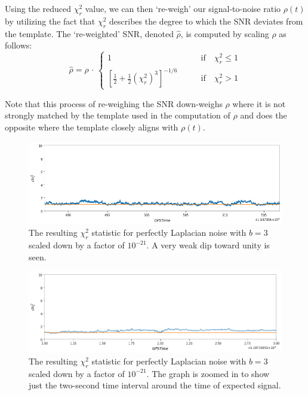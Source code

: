 \documentclass[preprint,
letterpaper,
 amsmath,amssymb,
 aps,
]{revtex4-2}
\begin{document}
Using the reduced $\chi_r^2$ value, we can then `re-weigh' our signal-to-noise ratio $\rho(t)$ by utilizing the fact that $\chi_r^2$ describes the degree to which the SNR deviates from the template. The `re-weighted' SNR, denoted $\hat{\rho}$, is computed by scaling $\rho$ as follows:
\begin{equation}
    \hat{\rho} = \rho \,\cdot \,
    \begin{cases}
    1     & \quad\quad\text{if}\quad \chi^2_r\leq1\\
     \left[\frac{1}{2} + \frac{1}{2}(\chi^2_r)^3\right]^{-1/6}   & \quad\quad\text{if}\quad \chi^2_r>1
    \end{cases}
\end{equation}

Note that this process of re-weighing the SNR down-weighs $\rho$ where it is not strongly matched by the template used in the computation of $\rho$ and does the opposite where the template closely aligns with $\rho(t)$.

\begin{figure}[t]
\includegraphics[width = .9\textwidth]{chi2 laplace b=3 zoomed.png}
\caption{The resulting $\chi^2_r$ statistic for perfectly Laplacian noise with $b=3$ scaled down by a factor of $10^{-21}$. A very weak dip toward unity is seen.}
\centering
\end{figure} 

\begin{figure}[t]
\includegraphics[width = .9\textwidth]{chi2 laplace b=3.png}
\caption{The resulting $\chi^2_r$ statistic for perfectly Laplacian noise with $b=3$ scaled down by a factor of $10^{-21}$. The graph is zoomed in to show just the two-second time interval around the time of expected signal.}
\centering
\end{figure} 
\end{document}
